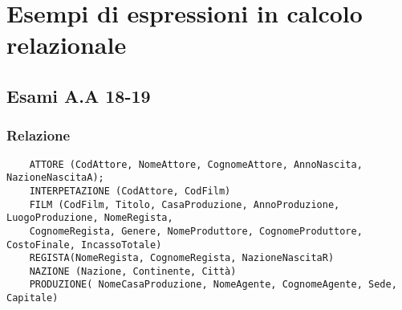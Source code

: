 \chapter{Esempi di espressioni in calcolo relazionale}

\section*{Esami A.A 18-19}
\subsection*{Relazione}
\begin{verbatim}
	ATTORE (CodAttore, NomeAttore, CognomeAttore, AnnoNascita, NazioneNascitaA);
	INTERPETAZIONE (CodAttore, CodFilm)
	FILM (CodFilm, Titolo, CasaProduzione, AnnoProduzione, LuogoProduzione, NomeRegista,
	CognomeRegista, Genere, NomeProduttore, CognomeProduttore, CostoFinale, IncassoTotale)
	REGISTA(NomeRegista, CognomeRegista, NazioneNascitaR)
	NAZIONE (Nazione, Continente, Città)
	PRODUZIONE( NomeCasaProduzione, NomeAgente, CognomeAgente, Sede, Capitale) 
\end{verbatim}

